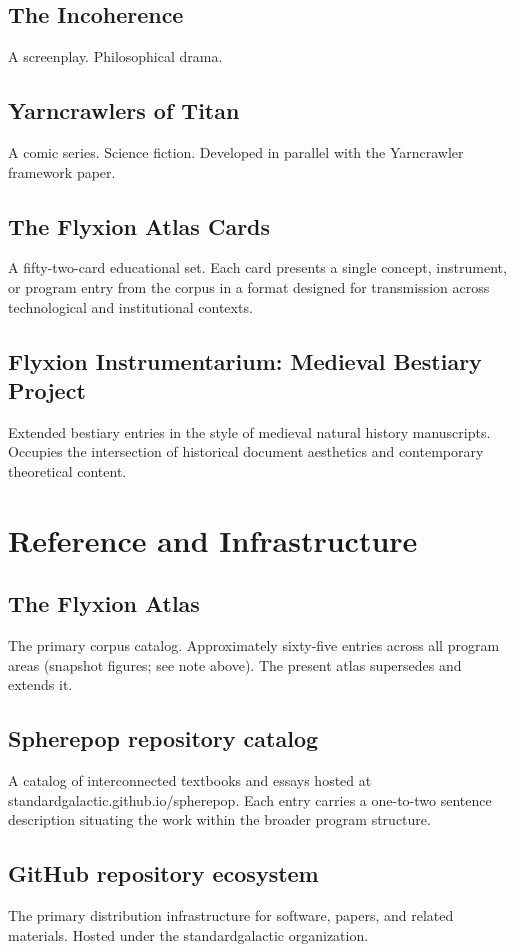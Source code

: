 \documentclass[12pt, openany]{book}
\begin{document}
\subsection{The Incoherence} A screenplay. Philosophical drama.

\subsection{Yarncrawlers of Titan} A comic series. Science fiction.
Developed in parallel with the Yarncrawler framework paper.

\subsection{The Flyxion Atlas Cards} A fifty-two-card educational set.
Each card presents a single concept, instrument, or program entry from
the corpus in a format designed for transmission across technological
and institutional contexts.

\subsection{Flyxion Instrumentarium: Medieval Bestiary Project} Extended
bestiary entries in the style of medieval natural history manuscripts.
Occupies the intersection of historical document aesthetics and
contemporary theoretical content.

\section{Reference and Infrastructure}

\subsection{The Flyxion Atlas} The primary corpus catalog. Approximately
sixty-five entries across all program areas (snapshot figures; see note
above). The present atlas supersedes
and extends it.

\subsection{Spherepop repository catalog} A catalog of interconnected
textbooks and essays hosted at standardgalactic.github.io/spherepop.
Each entry carries a one-to-two sentence description situating the work
within the broader program structure.

\subsection{GitHub repository ecosystem} The primary distribution
infrastructure for software, papers, and related materials. Hosted
under the standardgalactic organization.
\end{document}
